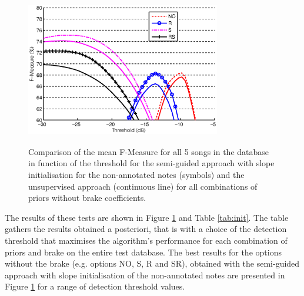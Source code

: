\documentclass{article}
\begin{document}
\begin{figure}[!ht]
\begin{minipage}[b]{1.0\linewidth}
  \centering
  \centerline{\includegraphics[width=8.5cm, height=6.7cm]{figures/finalnobrake.eps}}
\end{minipage}
\caption{Comparison of the mean F-Measure for all 5 songs in the database in function of the threshold for the semi-guided approach with slope initialisation for the non-annotated notes (symbols) and the unsupervised approach (continuous line) for all combinations of priors without brake coefficients.}
\label{fig:fxt-nobrake}
\end{figure}

\vspace{0.2cm}

The results of these tests are shown in Figure \ref{fig:fxt-nobrake} and Table \ref{tab:init}.  The table gathers the results obtained a posteriori, that is with a choice of the detection threshold that maximises the algorithm's performance for each combination of priors and brake on the entire test database. The best results for the options without the brake (e.g. options NO, S, R and SR), obtained with the semi-guided approach with slope initialisation of the non-annotated notes are presented in Figure \ref{fig:fxt-nobrake} for a range of detection threshold values.

\vspace{0.2cm}
\end{document}
